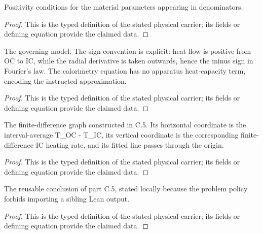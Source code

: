 \begin{definition}
  \label{def:physics:IPhO_2026_4_C_6:aux025}
  Positivity conditions for the material parameters appearing in denominators.
\end{definition}
\begin{proof}
  This is the typed definition of the stated physical carrier; its fields or defining equation provide the claimed data.
\end{proof}

\begin{definition}
  \label{def:physics:IPhO_2026_4_C_6:aux026}
  The governing model. The sign convention is explicit: heat flow is positive from OC to IC, while the radial derivative is taken outwards, hence the minus sign in Fourier's law. The calorimetry equation has no apparatus heat-capacity term, encoding the instructed approximation.
\end{definition}
\begin{proof}
  This is the typed definition of the stated physical carrier; its fields or defining equation provide the claimed data.
\end{proof}

\begin{definition}
  \label{def:physics:IPhO_2026_4_C_6:aux027}
  The finite-difference graph constructed in C.5. Its horizontal coordinate is the interval-average T\_OC - T\_IC, its vertical coordinate is the corresponding finite-difference IC heating rate, and its fitted line passes through the origin.
\end{definition}
\begin{proof}
  This is the typed definition of the stated physical carrier; its fields or defining equation provide the claimed data.
\end{proof}

\begin{definition}
  \label{def:physics:IPhO_2026_4_C_6:aux028}
  The reusable conclusion of part C.5, stated locally because the problem policy forbids importing a sibling Lean output.
\end{definition}
\begin{proof}
  This is the typed definition of the stated physical carrier; its fields or defining equation provide the claimed data.
\end{proof}

